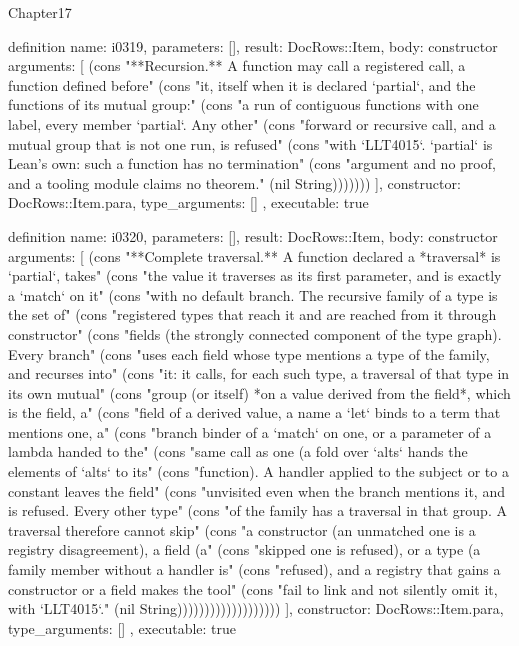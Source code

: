 \begin{lexlean}{Chapter17}
\begin{semanticmodule}
definition{
  name: i0319,
  parameters: [],
  result: DocRows::Item,
  body: constructor{
    arguments: [
      (cons "**Recursion.** A function may call a registered call, a function defined before" (cons "it, itself when it is declared `partial`, and the functions of its mutual group:" (cons "a run of contiguous functions with one label, every member `partial`. Any other" (cons "forward or recursive call, and a mutual group that is not one run, is refused" (cons "with `LLT4015`. `partial` is Lean's own: such a function has no termination" (cons "argument and no proof, and a tooling module claims no theorem." (nil String)))))))
    ],
    constructor: DocRows::Item.para,
    type_arguments: []
  },
  executable: true
}

definition{
  name: i0320,
  parameters: [],
  result: DocRows::Item,
  body: constructor{
    arguments: [
      (cons "**Complete traversal.** A function declared a *traversal* is `partial`, takes" (cons "the value it traverses as its first parameter, and is exactly a `match` on it" (cons "with no default branch. The recursive family of a type is the set of" (cons "registered types that reach it and are reached from it through constructor" (cons "fields (the strongly connected component of the type graph). Every branch" (cons "uses each field whose type mentions a type of the family, and recurses into" (cons "it: it calls, for each such type, a traversal of that type in its own mutual" (cons "group (or itself) *on a value derived from the field*, which is the field, a" (cons "field of a derived value, a name a `let` binds to a term that mentions one, a" (cons "branch binder of a `match` on one, or a parameter of a lambda handed to the" (cons "same call as one (a fold over `alts` hands the elements of `alts` to its" (cons "function). A handler applied to the subject or to a constant leaves the field" (cons "unvisited even when the branch mentions it, and is refused. Every other type" (cons "of the family has a traversal in that group. A traversal therefore cannot skip" (cons "a constructor (an unmatched one is a registry disagreement), a field (a" (cons "skipped one is refused), or a type (a family member without a handler is" (cons "refused), and a registry that gains a constructor or a field makes the tool" (cons "fail to link and not silently omit it, with `LLT4015`." (nil String)))))))))))))))))))
    ],
    constructor: DocRows::Item.para,
    type_arguments: []
  },
  executable: true
}


\end{semanticmodule}
\end{lexlean}
